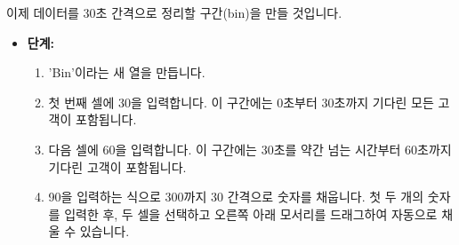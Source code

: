 \documentclass[11pt,a4paper]{article}
\theoremstyle{definition}
\begin{document}
\begin{tcolorbox}[title={구간 (Bin) 생성}]
이제 데이터를 30초 간격으로 정리할 구간(bin)을 만들 것입니다.

\begin{itemize}
    \item \textbf{단계:}
    \begin{enumerate}
        \item 'Bin'이라는 새 열을 만듭니다.
        \item 첫 번째 셀에 30을 입력합니다. 이 구간에는 0초부터 30초까지 기다린 모든 고객이 포함됩니다.
        \item 다음 셀에 60을 입력합니다. 이 구간에는 30초를 약간 넘는 시간부터 60초까지 기다린 고객이 포함됩니다.
        \item 90을 입력하는 식으로 300까지 30 간격으로 숫자를 채웁니다. 첫 두 개의 숫자를 입력한 후, 두 셀을 선택하고 오른쪽 아래 모서리를 드래그하여 자동으로 채울 수 있습니다.
    \end{enumerate}
\end{itemize}

\begin{center}
\label{fig:excel_create_bins}
\end{center}
\end{tcolorbox}
\end{document}
